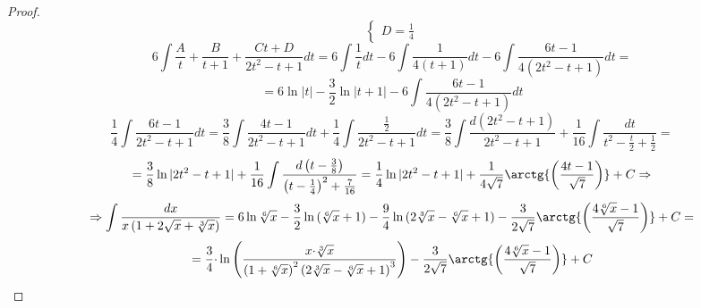 \documentclass[12pt]{article}
\theoremstyle{definition}
\DeclareMathOperator{\dint}{\displaystyle\int}
\begin{document}
\begin{proof}
$$\begin{cases}
			D = \tfrac{1}{4}
		\end{cases}
	$$
	$$
		6 \dint\dfrac{A}{t} + \dfrac{B}{t+1} + \dfrac{Ct + D}{2t^2 -t +1} dt = 6\dint\dfrac{1}{t}dt - 6\dint\dfrac{1}{4(t + 1)}dt - 6\dint\dfrac{6t - 1}{4(2t^2 - t + 1)}dt =
	$$
	$$
		= 6 \ln{|t|} - \dfrac{3}{2}\ln{|t + 1|} - 6 \dint\dfrac{6t - 1}{4(2t^2 - t + 1)}dt
	$$
	$$
		\dfrac{1}{4}\dint\dfrac{6t - 1}{2t^2 - t + 1}dt = \dfrac{3}{8}\dint\dfrac{4t - 1}{2t^2 - t + 1}dt + \dfrac{1}{4}\dint\dfrac{\tfrac{1}{2}}{2t^2 - t + 1}dt = \dfrac{3}{8}\dint\dfrac{d(2t^2 - t + 1)}{2t^2 - t + 1} + \dfrac{1}{16}\dint \dfrac{dt}{t^2 -\tfrac{t}{2} + \tfrac{1}{2}} = 
	$$	
	$$
		=	\dfrac{3}{8}\ln{|2t^2 - t + 1|} + \dfrac{1}{16}\dint\dfrac{d\left(t - \tfrac{3}{8}\right)}{\left(t - \tfrac{1}{4}\right)^2 + \tfrac{7}{16}} = \dfrac{1}{4}\ln{|2t^2 - t + 1|} + \dfrac{1}{4\sqrt{7}}\arctg{\left(\dfrac{4t - 1}{\sqrt{7}}\right)} + C \Rightarrow
	$$
	$$
		\Rightarrow \dint \dfrac{dx}{x\left(1 + 2\sqrt{x} + \sqrt[3]{x} \right)} = 6\ln{\sqrt[6]{x}} - \dfrac{3}{2}\ln{(\sqrt[6]{x} + 1)} - \dfrac{9}{4}\ln{(2\sqrt[3]{x} - \sqrt[6]{x} + 1)} - \dfrac{3}{2\sqrt{7}}\arctg{\left(\dfrac{4\sqrt[6]{x} - 1}{\sqrt{7}}\right)} + C =
	$$
	$$
		= \dfrac{3}{4}{\cdot}\ln{\left(\dfrac{x{\cdot}\sqrt[3]{x}}{\left(1 + \sqrt[6]{x}\right)^2\left(2 \sqrt[3]{x} - \sqrt[6]{x} + 1\right)^3}\right)} - \dfrac{3}{2\sqrt{7}}\arctg{\left(\dfrac{4\sqrt[6]{x} - 1}{\sqrt{7}}\right)} + C
	$$	
\end{proof}
\newpage
\end{document}
